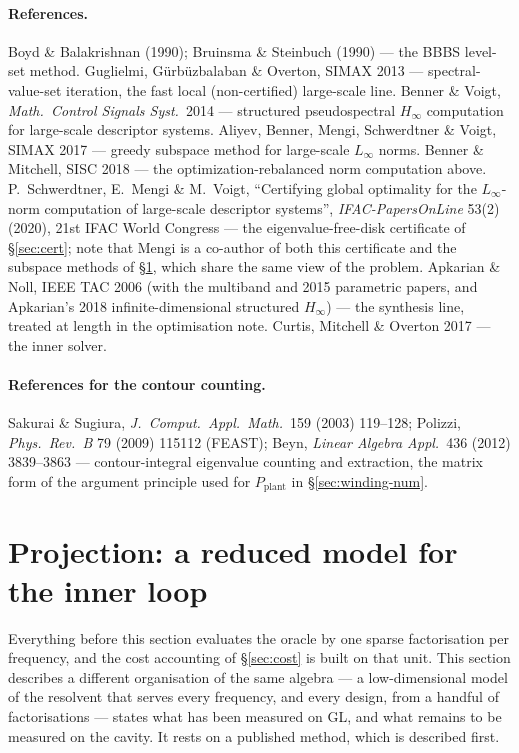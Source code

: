 \documentclass[11pt,a4paper]{article}
\newcommand{\revP}[1]{#1}
\newcommand{\revQ}[1]{{\color{revQ}#1}}
\begin{document}
{\paragraph{References.}
Boyd \& Balakrishnan (1990); Bruinsma \& Steinbuch (1990) --- the BBBS level-set method.
Guglielmi, G\"urb\"uzbalaban \& Overton, SIMAX 2013 --- spectral-value-set iteration,
the fast local (non-certified) large-scale line.
Benner \& Voigt, \emph{Math.\ Control Signals Syst.}\ 2014 --- structured pseudospectral
$H_\infty$ computation for large-scale descriptor systems.
Aliyev, Benner, Mengi, Schwerdtner \& Voigt, SIMAX 2017 --- greedy subspace method for
large-scale $L_\infty$ norms.
Benner \& Mitchell, SISC 2018 --- the optimization-rebalanced norm computation above.
\revQ{P.~Schwerdtner, E.~Mengi \& M.~Voigt, ``Certifying global optimality for the
$L_\infty$-norm computation of large-scale descriptor systems'', \emph{IFAC-PapersOnLine}
53(2) (2020), 21st IFAC World Congress --- the eigenvalue-free-disk certificate of
\S\ref{sec:cert}; note that Mengi is a co-author of both this certificate and the
subspace methods of \S\ref{sec:proj}, which share the same view of the problem.}
Apkarian \& Noll, IEEE TAC 2006 (with the multiband and 2015 parametric papers, and
Apkarian's 2018 infinite-dimensional structured $H_\infty$) --- the synthesis line,
treated at length in the optimisation note.  Curtis, Mitchell \& Overton 2017 --- the
inner solver.

\paragraph{References for the contour counting.}
Sakurai \& Sugiura, \emph{J.\ Comput.\ Appl.\ Math.}\ 159 (2003) 119--128; Polizzi,
\emph{Phys.\ Rev.\ B} 79 (2009) 115112 (FEAST); Beyn, \emph{Linear Algebra Appl.}\ 436
(2012) 3839--3863 --- contour-integral eigenvalue counting and extraction, the matrix
form of the argument principle used for $P_{\mathrm{plant}}$ in \S\ref{sec:winding-num}.

\revP{\section{Projection: a reduced model for the inner loop}
\label{sec:proj}

Everything before this section evaluates the oracle by one sparse factorisation per
frequency, and the cost accounting of \S\ref{sec:cost} is built on that unit.  This
section describes a different organisation of the same algebra --- a low-dimensional
model of the resolvent that serves every frequency, and every design, from a handful of
factorisations --- states what has been measured on GL, and what remains to be measured
on the cavity.  It rests on a published method, which is described first.

}}
\end{document}
